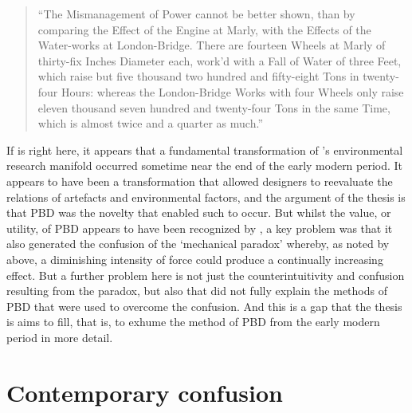 \documentclass[a4paper, 12pt]{article}
\begin{document}
\begin{quotation}
    ``The Mismanagement of Power cannot be better shown, than by comparing the Effect of the Engine at Marly, with the Effects of the Water-works at London-Bridge. There are fourteen Wheels at Marly of thirty-fix Inches Diameter each, work'd with a Fall of Water of three Feet, which raise but five thousand two hundred and fifty-eight Tons in twenty-four Hours: whereas the London-Bridge Works with four Wheels only raise eleven thousand seven hundred and twenty-four Tons in the same Time, which is almost twice and a quarter as much.'' 
    \citep[p.~530]{desaguliers_course_1734a}
\end{quotation}

If \citeauthor{desaguliers_course_1734} is right here, it appears that a fundamental transformation of \citeauthor{busbea_responsive_2019}'s environmental research manifold occurred sometime near the end of the early modern period. It appears to have been a transformation that allowed designers to reevaluate the relations of artefacts and environmental factors, and the argument of the thesis is that PBD was the novelty that enabled such to occur. But whilst the value, or utility, of PBD appears to have been recognized by \citeauthor{desaguliers_course_1734}, a key problem was that it also generated the confusion of the `mechanical paradox' whereby, as noted by \citeauthor{desaguliers_course_1734} above, a diminishing intensity of force could produce a continually increasing effect. But a further problem here is not just the counterintuitivity and confusion resulting from the paradox, but also that \citeauthor{desaguliers_course_1734} did not fully explain the methods of PBD that were used to overcome the confusion. And this is a gap that the thesis is aims to fill, that is, to exhume the method of PBD from the early modern period in more detail.

\section{Contemporary confusion} 
\label{sec:contemporary:confusion}
\end{document}
